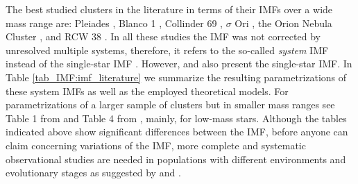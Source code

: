 \documentclass[12pt]{article}
\begin{document}

The best studied clusters in the literature in terms of their IMFs over a wide mass range are: Pleiades \citep[0.03~-~10 $M_\odot$;][]{Moraux2003}, Blanco 1 \citep[0.03~-~3 $M_\odot$;][]{Moraux2007a}, Collinder 69 \citep[0.016~-~20 $M_\odot$;][]{Bayo2011}, $\sigma$ Ori \citep[0.006~-~19 $M_\odot$;][]{PenaRamirez2012}, the Orion Nebula Cluster \citep[\ac{ONC}; 0.025~-~3 $M_\odot$, $\approx$0.005~-~1 $M_\odot$;][respectively]{DaRio2012,Drass2016}, and RCW 38 \citep[0.02~-~20 $M_\odot$;][]{Muzic2017}. In all these studies the IMF was not corrected by unresolved multiple systems, therefore, it refers to the so-called {\it system} IMF instead of the single-star IMF \citep{Chabrier2003a}. However, \citet{Moraux2003} and \citet{Muzic2017} also present the single-star IMF. In Table \ref{tab_IMF:imf_literature} we summarize the resulting parametrizations of these system IMFs as well as the employed theoretical models. For parametrizations of a larger sample of clusters but in smaller mass ranges see Table 1 from \citet{DeMarchi2010} and Table 4 from \citet{Muzic2017}, mainly, for low-mass stars. Although the tables indicated above show significant differences between the IMF, before anyone can claim concerning variations of the IMF, more complete and systematic observational studies are needed in populations with different environments and evolutionary stages as suggested by \citet{Bastian2010} and \citet{Offner2014}.
\end{document}
